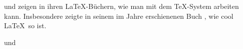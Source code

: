 \documentclass[12pt,ngerman]{scrarticle}
\begin{document}
\blindtext 


\cite{knuth} und \cite{Voss2017} zeigen in ihren \LaTeX-Büchern, wie man mit dem \TeX-System arbeiten kann. Insbesondere \citeauthor{Voss2017} zeigte in seinem im Jahre \citeyear{Voss2017} erschienenen Buch , wie cool \LaTeX\ so ist.

\blindtext \cite{Voss2017} und \cite{knuth}


\printbibliography
\end{document}
